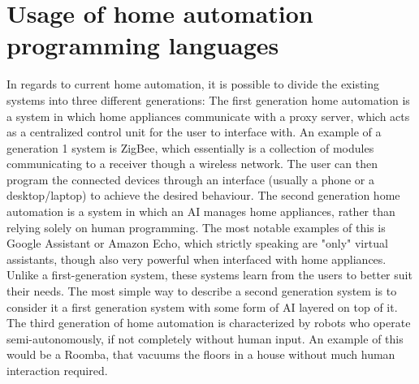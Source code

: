 \section{Usage of home automation programming languages} %
In regards to current home automation, it is possible to divide the existing systems into three different generations\cite{chinese-home-automation}:
\newline
The first generation home automation is a system in which home appliances communicate with a proxy server, which acts as a centralized control unit for the user to interface with. An example of a generation 1 system is ZigBee\cite{zigbee}, which essentially is a collection of modules communicating to a receiver though a wireless network. The user can then program the connected devices through an interface (usually a phone or a desktop/laptop) to achieve the desired behaviour.
\newline
The second generation home automation is a system in which an AI manages home appliances, rather than relying solely on human programming. The most notable examples of this is Google Assistant or Amazon Echo, which strictly speaking are "only" virtual assistants, though also very powerful when interfaced with home appliances. Unlike a first-generation system, these systems learn from the users to better suit their needs. The most simple way to describe a second generation system is to consider it a first generation system with some form of AI layered on top of it.
\newline
The third generation of home automation is characterized by robots who operate semi-autonomously, if not completely without human input. An example of this would be a Roomba, that vacuums the floors in a house without much human interaction required.
\newline